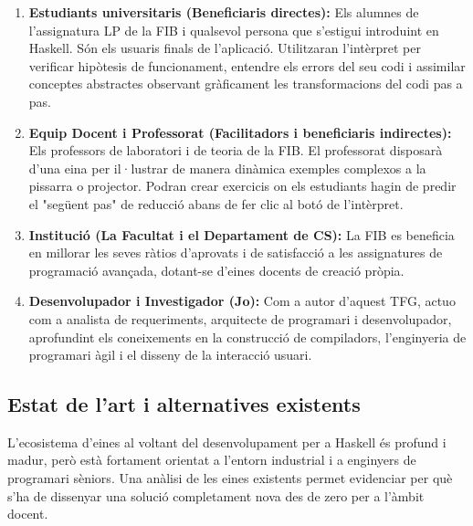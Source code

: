 \begin{enumerate}
    \item \textbf{Estudiants universitaris (Beneficiaris directes):} Els alumnes de l'assignatura LP de la FIB i qualsevol persona que s'estigui introduint en Haskell. Són els usuaris finals de l'aplicació. Utilitzaran l'intèrpret per verificar hipòtesis de funcionament, entendre els errors del seu codi i assimilar conceptes abstractes observant gràficament les transformacions del codi pas a pas.
    
    \item \textbf{Equip Docent i Professorat (Facilitadors i beneficiaris indirectes):} Els professors de laboratori i de teoria de la FIB. El professorat disposarà d'una eina per il·lustrar de manera dinàmica exemples complexos a la pissarra o projector. Podran crear exercicis on els estudiants hagin de predir el "següent pas" de reducció abans de fer clic al botó de l'intèrpret.
    
    \item \textbf{Institució (La Facultat i el Departament de CS):} La FIB es beneficia en millorar les seves ràtios d'aprovats i de satisfacció a les assignatures de programació avançada, dotant-se d'eines docents de creació pròpia.
    
    \item \textbf{Desenvolupador i Investigador (Jo):} Com a autor d'aquest TFG, actuo com a analista de requeriments, arquitecte de programari i desenvolupador, aprofundint els coneixements en la construcció de compiladors, l'enginyeria de programari àgil i el disseny de la interacció usuari.
\end{enumerate}

\subsection{Estat de l'art i alternatives existents}
L'ecosistema d'eines al voltant del desenvolupament per a Haskell és profund i madur, però està fortament orientat a l'entorn industrial i a enginyers de programari sèniors. Una anàlisi de les eines existents permet evidenciar per què s'ha de dissenyar una solució completament nova des de zero per a l'àmbit docent.

